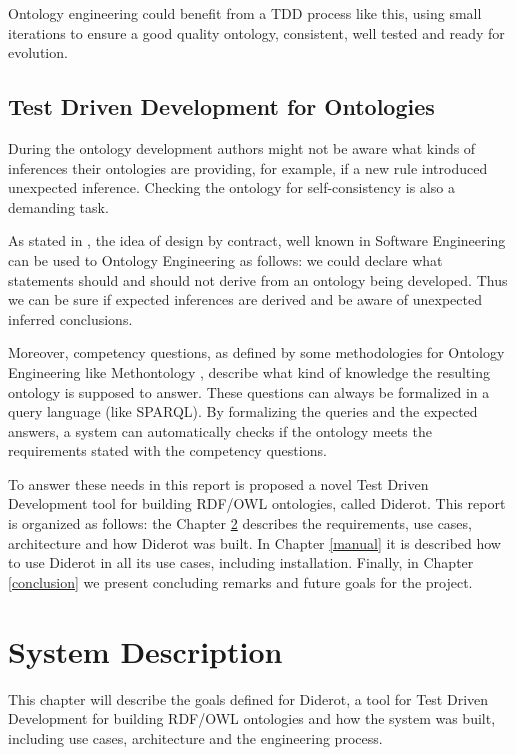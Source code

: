 \documentclass{report}
\begin{document}
Ontology engineering could benefit from a TDD process like this, using small iterations
to ensure a good quality ontology, consistent, well tested and ready for evolution.

\section{Test Driven Development for Ontologies}

During the ontology development authors might not be aware what kinds of inferences their ontologies are
providing, for example, if a new rule introduced unexpected inference. Checking the ontology for
self-consistency is also a demanding task.

As stated in \cite{vrandevcic06}, the idea of design by contract, well known in Software Engineering can
be used to Ontology Engineering as follows: we could declare what statements should and
should not derive from an ontology being developed. Thus we can be sure if expected inferences are
derived and be aware of unexpected inferred conclusions.

Moreover, competency questions, as defined by some methodologies for Ontology Engineering like Methontology \cite{lopez99},
describe what kind of knowledge the resulting ontology is supposed to answer. These questions can always be formalized in
a query language (like SPARQL). By formalizing the queries and the expected answers, a system can automatically checks if
the ontology meets the requirements stated with the competency questions.


To answer these needs in this report is proposed a novel Test Driven Development tool for building RDF/OWL ontologies, called
Diderot. This report is organized as follows: the Chapter \ref{system} describes the requirements, use cases, architecture and
how Diderot was built. In Chapter \ref{manual} it is described how to use Diderot in all its use cases, including installation.
Finally, in Chapter \ref{conclusion} we present concluding remarks and future goals for the project.

\chapter{System Description}
\label{system}

This chapter will describe the goals defined for Diderot, a tool for Test Driven Development for building RDF/OWL ontologies
and how the system was built, including use cases, architecture and the engineering process.
\end{document}
